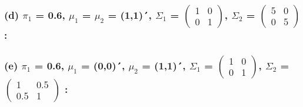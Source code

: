 \documentclass[a4paper, 10pt]{article}
\begin{document}
\subsubsection*{(d) $\pi_{1}$ = 0.6, $\mu_{1}$ = $\mu_{2}$ = (1,1)´, $\Sigma_{1}$ = $\begin{pmatrix} 1 & 0 \\ 0 & 1 \end{pmatrix}$,
$\Sigma_{2}$ =  $\begin{pmatrix} 5 & 0 \\ 0 & 5 \end{pmatrix}$ :}

\subsubsection*{(e) $\pi_{1}$ = 0.6, $\mu_{1}$ = (0,0)´, $\mu_{2}$ = (1,1)´, $\Sigma_{1}$ = $\begin{pmatrix} 1 & 0 \\ 0 & 1 \end{pmatrix}$,
$\Sigma_{2}$ = $\begin{pmatrix} 1 & 0.5 \\ 0.5 & 1 \end{pmatrix}$ :}
\end{document}
